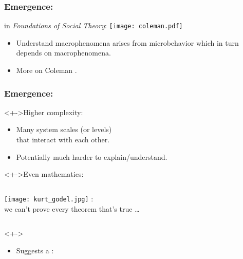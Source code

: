 \begin{frame}
  \frametitle{Emergence:}

  \begin{block}{
      \smallskip
      in \textit{Foundations of Social Theory}:}
    \texttt{[image: coleman.pdf]}
  \end{block}

  \bigskip

  \begin{block}{}
  \begin{itemize}
  \item 
    Understand macrophenomena arises from microbehavior
    which in turn depends on macrophenomena.\cite{coleman1994a}
  \item<2->
    More on Coleman 
    .
  \end{itemize}
  \end{block}

\end{frame}

\begin{frame}
  \frametitle{Emergence:}

  \begin{block}<+->{Higher complexity:}
    \begin{itemize}
    \item 
      Many system scales (or levels) \\ 
      that
      interact with each other.
    \item<+->
      Potentially much harder to explain/understand.
    \end{itemize}
  \end{block}

  \begin{block}<+->{Even mathematics:\cite{foote2007a}}
    \begin{columns}
      \texttt{[image: kurt\_godel.jpg]}
      :\\
      we can't prove every theorem that's true \ldots
    \end{columns}
  \end{block}

  \begin{block}<+->{}
    \begin{itemize}
    \item 
      Suggests a :
    \end{itemize}
  \end{block}

\end{frame}


